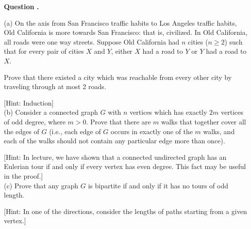 \documentclass[12pt]{article}
\newcounter{questionnumber}
\newenvironment{question}[1][]{\stepcounter{questionnumber}\par\noindent\textbf{Question \thequestionnumber. #1}\par}{\par}
\begin{document}
\begin{question}
    \noindent
    (a) On the axis from San Francisco traffic habits to Los Angeles traffic habits, Old California is more towards San Francisco: that is, civilized. In Old California, all roads were one way streets. Suppose Old California had $n$ cities ($n \geq 2$) such that for every pair of cities $X$ and $Y$, either $X$ had a road to $Y$ or $Y$ had a road to $X$.
    
    Prove that there existed a city which was reachable from every other city by traveling through at most 2 roads.

    [Hint: Induction]\\
    (b) Consider a connected graph $G$ with $n$ vertices which has exactly $2m$ vertices of odd degree, where $m > 0$. Prove that there are $m$ walks that together cover all the edges of $G$ (i.e., each edge of $G$ occurs in exactly one of the $m$ walks, and each of the walks should not contain any particular edge more than once).

    [Hint: In lecture, we have shown that a connected undirected graph has an Eulerian tour if and only if every vertex has even degree. This fact may be useful in the proof.]\\
    (c) Prove that any graph $G$ is bipartite if and only if it has no tours of odd length.

    [Hint: In one of the directions, consider the lengths of paths starting from a given vertex.]
\end{question}
\end{document}
